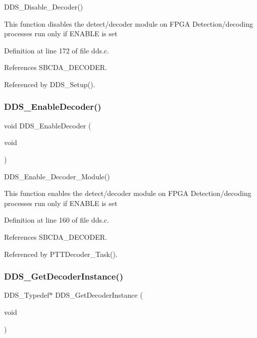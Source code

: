 D\+D\+S\+\_\+\+Disable\+\_\+\+Decoder()

This function disables the detect/decoder module on F\+P\+GA Detection/decoding processes run only if E\+N\+A\+B\+LE is set 

Definition at line 172 of file dds.\+c.



References S\+B\+C\+D\+A\+\_\+\+D\+E\+C\+O\+D\+ER.



Referenced by D\+D\+S\+\_\+\+Setup().

\mbox{\label{group___d_d_s_gacd945ae15e0559f2d8dce2860354ed57}} 
\subsubsection{\texorpdfstring{D\+D\+S\+\_\+\+Enable\+Decoder()}{DDS\_EnableDecoder()}}
{\footnotesize\ttfamily void D\+D\+S\+\_\+\+Enable\+Decoder (\begin{DoxyParamCaption}\item[{void}]{ }\end{DoxyParamCaption})}

D\+D\+S\+\_\+\+Enable\+\_\+\+Decoder\+\_\+\+Module()

This function enables the detect/decoder module on F\+P\+GA Detection/decoding processes run only if E\+N\+A\+B\+LE is set 

Definition at line 160 of file dds.\+c.



References S\+B\+C\+D\+A\+\_\+\+D\+E\+C\+O\+D\+ER.



Referenced by P\+T\+T\+Decoder\+\_\+\+Task().

\mbox{\label{group___d_d_s_ga03744649eaa04f0f029df082e6ca9575}} 
\subsubsection{\texorpdfstring{D\+D\+S\+\_\+\+Get\+Decoder\+Instance()}{DDS\_GetDecoderInstance()}}
{\footnotesize\ttfamily D\+D\+S\+\_\+\+Typedef$\ast$ D\+D\+S\+\_\+\+Get\+Decoder\+Instance (\begin{DoxyParamCaption}\item[{void}]{ }\end{DoxyParamCaption})}

